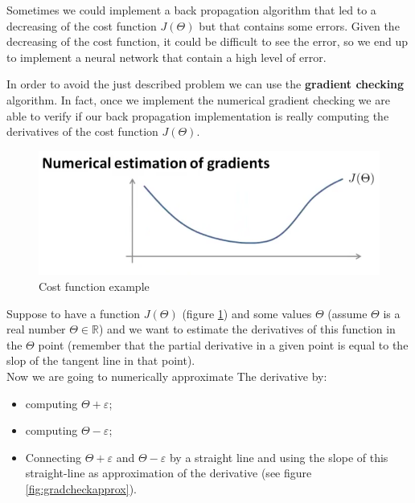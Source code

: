 Sometimes we could implement a back propagation algorithm that led to a decreasing of the cost function $J(\Theta)$ but that contains some errors. Given the decreasing of the cost function, it could be difficult to see the error, so we end up to implement a neural network that contain a high level of error.

In order to avoid the just described problem we can use the {\bf gradient checking} algorithm. In fact, once we implement the numerical gradient checking we are able to verify if our back propagation implementation is really computing the derivatives of the cost function $J(\Theta)$.

\begin{figure}
\begin{center}
\includegraphics[scale=0.2]{images/gradcheck}
\end{center}
\caption{Cost function example } 
\label{fig:gradcheck}
\end{figure}

Suppose to have a function $J(\Theta)$ (figure \ref{fig:gradcheck}) and some values $\Theta$ (assume $\Theta$ is a real number $\Theta \in\mathbb{R}$) and we want to estimate the derivatives of this function in the $\Theta$ point (remember that the partial derivative in a given point is equal to the slop of the tangent line in that point).
\\


Now we are going to numerically approximate The derivative by:
\begin{itemize}
\item computing $\Theta + \varepsilon$;
\item computing $\Theta - \varepsilon$;
\item Connecting $\Theta + \varepsilon$ and $\Theta - \varepsilon$ by a straight line and using the slope of this straight-line as approximation of the derivative (see figure \ref{fig:gradcheckapprox}).
\end{itemize}


